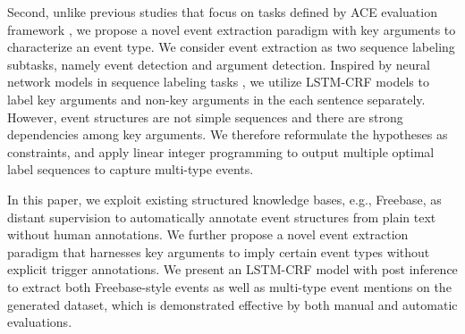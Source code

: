 Second, unlike previous studies that focus on tasks defined by ACE evaluation framework
\cite{ahn2006stages,li2013joint,chen2015event,nguyen2016joint}, we propose a novel event extraction paradigm with key
arguments to characterize an event type. We consider event extraction as two sequence labeling subtasks, namely event
detection and argument detection. Inspired by neural network models in sequence labeling tasks
\cite{huang2015bidirectional,lample2016neural}, we utilize LSTM-CRF models to label key arguments and non-key arguments
in the each sentence separately. However, event structures are not simple sequences and there are strong dependencies
among key arguments. We therefore reformulate the hypotheses as constraints, and apply linear integer programming to
output multiple optimal label sequences to capture multi-type events.

In this paper, we exploit existing structured knowledge bases, e.g., Freebase, as distant supervision to automatically
annotate event structures from plain text without human annotations. We further propose a novel event extraction
paradigm that harnesses key arguments to imply certain event types without explicit trigger annotations. We present an
LSTM-CRF model with post inference to extract both Freebase-style events as well as multi-type event mentions on the
generated dataset, which is demonstrated effective by both manual and automatic evaluations.
